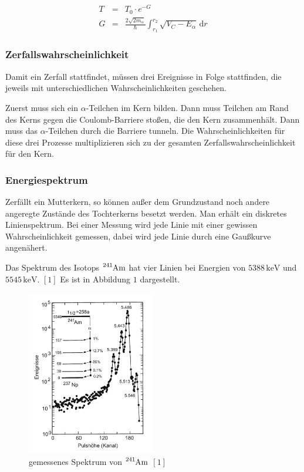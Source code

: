 \documentclass[12pt,a4paper]{scrartcl}
\numberwithin{equation}{section} %
\renewcommand{\[}{} %
\renewcommand{\]}{\noindent} %
\begin{document}
\[
\begin{eqnarray}
    T &=& T_0 \cdot e^{-G} \\
    G &=&
        \frac{2\sqrt{2m_\alpha}}{\hbar}
        \int_{r_{1}}^{r_{2}}\sqrt{V_{C}-E_{\alpha}}
        \,\mathrm dr
\end{eqnarray}
\]

\hypertarget{zerfallswahrscheinlichkeit}{%
\subsubsection{Zerfallswahrscheinlichkeit}\label{zerfallswahrscheinlichkeit}}

Damit ein Zerfall stattfindet, müssen drei Ereignisse in Folge
stattfinden, die jeweils mit unterschiedlichen Wahrscheinlichkeiten
geschehen.

Zuerst muss sich ein \(\alpha\)-Teilchen im Kern bilden. Dann muss
Teilchen am Rand des Kerns gegen die Coulomb-Barriere stoßen, die den
Kern zusammenhält. Dann muss das \(\alpha\)-Teilchen durch die Barriere
tunneln. Die Wahrscheinlichkeiten für diese drei Prozesse multiplizieren
sich zu der gesamten Zerfallswahrscheinlichkeit für den Kern.

\hypertarget{energiespektrum}{%
\subsubsection{Energiespektrum}\label{energiespektrum}}

Zerfällt ein Mutterkern, so können außer dem Grundzustand noch andere
angeregte Zustände des Tochterkerns besetzt werden. Man erhält ein
diskretes Linienspektrum. Bei einer Messung wird jede Linie mit einer
gewissen Wahrscheinlichkeit gemessen, dabei wird jede Linie durch eine
Gaußkurve angenähert.

Das Spektrum des Isotops \(\ce{^241Am}\) hat vier Linien bei Energien
von \(5388\mathrm{\,keV}\) und \(5545\mathrm{\,keV}\). \([1]\) Es ist in
Abbildung \(1\) dargestellt.

\begin{figure}
	\centering
	\includegraphics[width=0.5\textwidth]{../media/B3.3/Am241_Spektrum.pdf}
	\caption{gemessenes Spektrum von \(\ce{^241Am}\) \([1]\)}
	\label{abb:Spektrum 241Am}
\end{figure}
\end{document}
